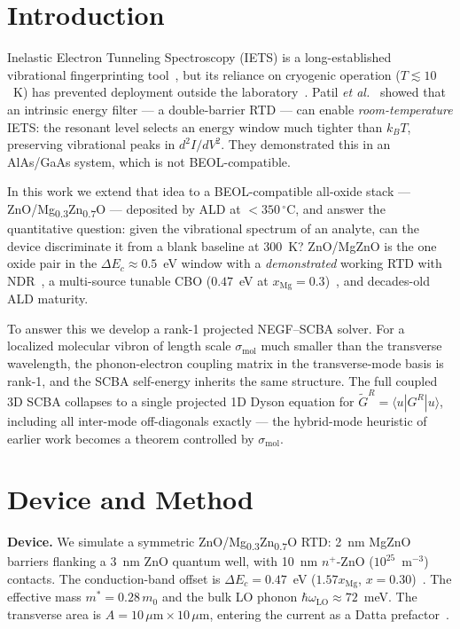 \documentclass[conference]{IEEEtran}
\begin{document}
\section{Introduction}

Inelastic Electron Tunneling Spectroscopy (IETS) is a long-established
vibrational fingerprinting tool~\cite{jaklevic1966}, but its reliance on
cryogenic operation ($T \lesssim 10$~K) has prevented deployment outside
the laboratory~\cite{galperin2007}. Patil \textit{et al.}~\cite{patil2018}
showed that an intrinsic energy filter --- a double-barrier RTD --- can
enable \emph{room-temperature} IETS: the resonant level selects an energy
window much tighter than $k_BT$, preserving vibrational peaks in
$d^2I/dV^2$. They demonstrated this in an AlAs/GaAs system, which is not
BEOL-compatible.

In this work we extend that idea to a BEOL-compatible all-oxide stack ---
ZnO/Mg\textsubscript{0.3}Zn\textsubscript{0.7}O --- deposited by ALD at
$<350\,^\circ$C, and answer the quantitative question: given the
vibrational spectrum of an analyte, can the device discriminate it from a
blank baseline at 300~K? ZnO/MgZnO is the one oxide pair in the
$\Delta E_c \approx 0.5$~eV window with a \emph{demonstrated} working RTD
with NDR~\cite{tampo2019}, a multi-source tunable CBO ($0.47$~eV at
$x_{\mathrm{Mg}} = 0.3$)~\cite{mgzno_cbo}, and decades-old ALD maturity.

To answer this we develop a rank-1 projected NEGF--SCBA solver. For a
localized molecular vibron of length scale $\sigma_{\mathrm{mol}}$ much
smaller than the transverse wavelength, the phonon-electron coupling
matrix in the transverse-mode basis is rank-1, and the SCBA self-energy
inherits the same structure. The full coupled 3D SCBA collapses to a
single projected 1D Dyson equation for
$\tilde G^R = \langle u| G^R |u\rangle$, including all inter-mode
off-diagonals exactly --- the hybrid-mode heuristic of earlier work becomes
a theorem controlled by $\sigma_{\mathrm{mol}}$.

\section{Device and Method}

\textbf{Device.} We simulate a symmetric ZnO/Mg\textsubscript{0.3}Zn\textsubscript{0.7}O
RTD: 2~nm MgZnO barriers flanking a 3~nm ZnO quantum well, with
10~nm $n^+$-ZnO ($10^{25}$~m$^{-3}$) contacts.
The conduction-band offset is $\Delta E_c = 0.47$~eV
($1.57 x_{\mathrm{Mg}}$, $x = 0.30$)~\cite{mgzno_cbo}. The effective mass
$m^* = 0.28\,m_0$ and the bulk LO phonon
$\hbar\omega_{\mathrm{LO}} \approx 72$~meV. The transverse area is
$A = 10\,\mu\mathrm{m} \times 10\,\mu\mathrm{m}$, entering the current as
a Datta prefactor~\cite{datta}.
\end{document}
